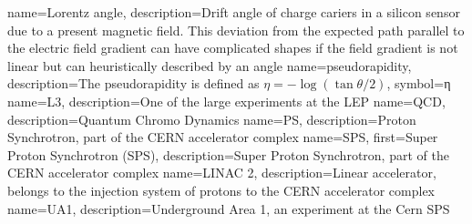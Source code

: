 
 { name={Lorentz angle}, description={Drift angle of charge cariers in a silicon sensor due to a present magnetic field. This deviation from the expected path parallel to the electric field gradient can have complicated shapes if the field gradient is not linear but can heuristically described by an angle}}
 { name={pseudorapidity}, description={The pseudorapidity is defined as $η=-\log(\tan{θ/2})$}, symbol={η} }
 { name={L3}, description={One of the large experiments at the LEP} }
 { name={QCD}, description={Quantum Chromo Dynamics} }
 { name={PS}, description={Proton Synchrotron, part of the CERN accelerator complex} }
 { name={SPS}, first={Super Proton Synchrotron (SPS)}, description={Super Proton Synchrotron, part of the CERN accelerator complex} }
 { name={LINAC 2}, description={Linear accelerator, belongs to the injection system of protons to the CERN accelerator complex} }
 { name={UA1}, description={Underground Area 1, an experiment at the Cern SPS}}


